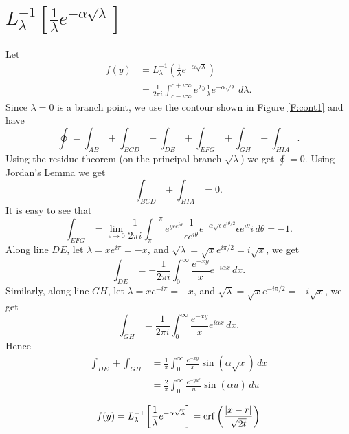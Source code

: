 \section{$ L_{\lambda}^{-1}[ 
  \frac{1}{\lambda} e^{-\alpha \sqrt{\lambda}} ] $ }
Let
\begin{align*}
  f(y) &= L_{\lambda}^{-1} 
          \left( 
            \frac{1}{\lambda} e^{-\alpha \sqrt{\lambda}} 
          \right)    \\
       &= \frac{1}{2\pi i}   
          \int_{c-i\infty}^{c+i\infty} e^{\lambda y} 
            \frac{1}{\lambda} e^{-\alpha \sqrt{\lambda}}  
            \, d\lambda.
\end{align*}
Since $\lambda=0$ is a branch point, we use the contour shown in Figure
\ref{F:cont1} and have
\[
  \oint = \int_{AB} + \int_{BCD} + \int_{DE} + \int_{EFG} + \int_{GH}
          + \int_{HIA}.
\]
Using the residue theorem (on the principal branch $\sqrt{\lambda}$) we get 
$\oint=0$. Using Jordan's Lemma we get
\[
  \int_{BCD} + \int_{HIA} = 0.
\]
It is easy to see that 
\[
  \int_{EFG} = \lim_{\epsilon \to 0} \frac{1}{2\pi i}
               \int_{\pi}^{-\pi} e^{y \epsilon e^{i\theta}}
               \frac{1}{\epsilon e^{i\theta}}
               e^{-\alpha \sqrt{\epsilon} e^{i\theta/2}}
               \epsilon e^{i\theta} i \, d\theta
             = -1.
\]
Along line $DE$, let $\lambda=x e^{i\pi}=-x$, and 
$\sqrt{\lambda}=\sqrt{x} e^{i\pi/2}=i\sqrt{x}$, we get
\[
  \int_{DE} = -\frac{1}{2\pi i} \int_0^{\infty} \frac{e^{-xy}}{x}
              e^{-i\alpha x} \, dx.
\]
Similarly, along line $GH$, let $\lambda=x e^{-i\pi}=-x$, and 
$\sqrt{\lambda}=\sqrt{x} e^{-i\pi/2}=-i\sqrt{x}$, we get
\[
  \int_{GH} = \frac{1}{2\pi i} \int_0^{\infty} \frac{e^{-xy}}{x}
              e^{i\alpha x} \, dx.
\]
Hence
\begin{align*}
  \int_{DE} + \int_{GH} 
    &= \frac{1}{\pi} 
      \int_0^{\infty} \frac{ e^{-xy} }{ x } \sin( \alpha \sqrt{x} ) \, dx \\
    &= \frac{2}{\pi} \int_0^{\infty} \frac{e^{-yu^2}}{u} \sin(\alpha u) \, du
\end{align*}




\begin{equation}  \label{E:ilt3}
  f(y) = L_{\lambda}^{-1} 
         \left[ 
           \frac{1}{\lambda} e^{-\alpha \sqrt{\lambda}}
         \right]
       = \operatorname*{erf} \left( \frac{|x-r|}{\sqrt{2t}} \right)
\end{equation}


